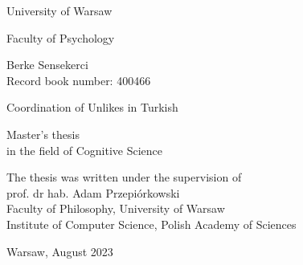 \begin{titlepage}
	\begin{center}
		\vspace*{1.5cm}
		
		{\huge University of Warsaw}
		
		\vspace{0.1cm}
		{\Large Faculty of Psychology}
		
		\vspace{3.5cm}
		
		{\Large Berke Sensekerci} \\ Record book number: 400466
		
		\vspace{2cm}
		
		{\huge Coordination of Unlikes in Turkish}
		
		
		\vspace{3cm}
		
		{\large Master's thesis \\ in the field of Cognitive Science}
	\end{center}
	
	\vspace{2.5cm}
	
	\begin{flushright}
		The thesis was written under the supervision of \\
		prof. dr hab. Adam Przepiórkowski \\
		Faculty of Philosophy, University of Warsaw \\
		Institute of Computer Science, Polish Academy of Sciences	
	\end{flushright}
	
	\vspace{2.5cm}
	
	\begin{center}
		Warsaw, August 2023
	\end{center}	
\end{titlepage}